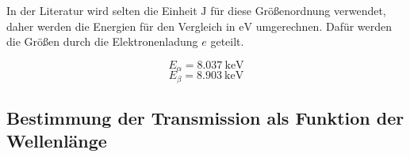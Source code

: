 In der Literatur wird selten die Einheit $\si{\joule}$ für diese Größenordnung verwendet, daher werden die Energien für den Vergleich in $\si{\electronvolt}$ umgerechnen.
Dafür werden die Größen durch die Elektronenladung $e$ geteilt.

\begin{equation}
    E_\alpha = \SI{8.037}{\kilo\electronvolt}
\end{equation}
\begin{equation}
    E_\beta = \SI{8.903}{\kilo\electronvolt}
\end{equation}

\subsection{Bestimmung der Transmission als Funktion der Wellenlänge}
\label{ssec:2}

